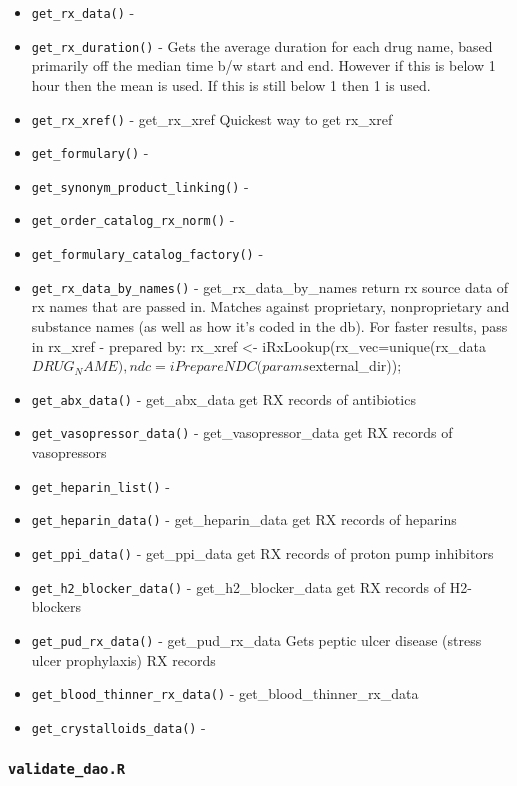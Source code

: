 \documentclass[
]{book}
\providecommand{\tightlist}{%
  \setlength{\itemsep}{0pt}\setlength{\parskip}{0pt}}
\begin{document}
\begin{itemize}
\tightlist
\item
  \texttt{get\_rx\_data()} -
\item
  \texttt{get\_rx\_duration()} - Gets the average duration for each drug name, based primarily off the median time b/w start and end. However if this is below 1 hour then the mean is used. If this is still below 1 then 1 is used.
\item
  \texttt{get\_rx\_xref()} - get\_rx\_xref Quickest way to get rx\_xref
\item
  \texttt{get\_formulary()} -
\item
  \texttt{get\_synonym\_product\_linking()} -
\item
  \texttt{get\_order\_catalog\_rx\_norm()} -
\item
  \texttt{get\_formulary\_catalog\_factory()} -
\item
  \texttt{get\_rx\_data\_by\_names()} - get\_rx\_data\_by\_names return rx source data of rx names that are passed in. Matches against proprietary, nonproprietary and substance names (as well as how it's coded in the db). For faster results, pass in rx\_xref - prepared by: rx\_xref \textless- iRxLookup(rx\_vec=unique(rx\_data\(DRUG_NAME),ndc=iPrepareNDC(params\)external\_dir));
\item
  \texttt{get\_abx\_data()} - get\_abx\_data get RX records of antibiotics
\item
  \texttt{get\_vasopressor\_data()} - get\_vasopressor\_data get RX records of vasopressors
\item
  \texttt{get\_heparin\_list()} -
\item
  \texttt{get\_heparin\_data()} - get\_heparin\_data get RX records of heparins
\item
  \texttt{get\_ppi\_data()} - get\_ppi\_data get RX records of proton pump inhibitors
\item
  \texttt{get\_h2\_blocker\_data()} - get\_h2\_blocker\_data get RX records of H2-blockers
\item
  \texttt{get\_pud\_rx\_data()} - get\_pud\_rx\_data Gets peptic ulcer disease (stress ulcer prophylaxis) RX records
\item
  \texttt{get\_blood\_thinner\_rx\_data()} - get\_blood\_thinner\_rx\_data
\item
  \texttt{get\_crystalloids\_data()} -
\end{itemize}

\hypertarget{validate_dao.r}{%
\subsubsection{\texorpdfstring{\texttt{validate\_dao.R}}{validate\_dao.R}}\label{validate_dao.r}}
\end{document}
